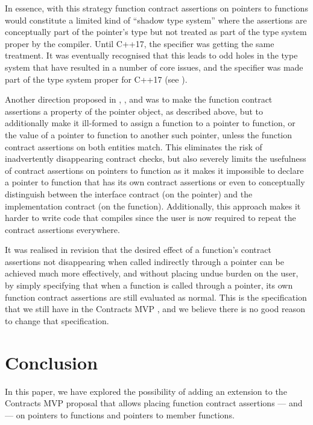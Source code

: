 In essence, with this strategy function contract assertions on pointers to functions would constitute a limited kind of ``shadow type system'' where the assertions are conceptually part of the pointer's type but not treated as part of the type system proper by the compiler. Until C++17, the  specifier was getting the same treatment. It was eventually recognised that this leads to odd holes in the type system that have resulted in a number of core issues, and the  specifier was made part of the type system proper for C++17 (see \cite{P0012R1}).

Another direction proposed in \cite{N4415}, \cite{P0287R0}, and \cite{P0380R0} was to make the function contract assertions a property of the pointer object, as described above, but to additionally make it ill-formed to assign a function to a pointer to function, or the value of a pointer to function to another such pointer, unless the function contract assertions on both entities match. This eliminates the risk of inadvertently disappearing contract checks, but also severely limits the usefulness of contract assertions on pointers to function as it makes it impossible to declare a pointer to function that has its own contract assertions or even to conceptually distinguish between the interface contract (on the pointer) and the implementation contract (on the function). Additionally, this approach makes it harder to write code that compiles since the user is now required to repeat the contract assertions everywhere.

It was realised in revision \cite{P0380R1} that the desired effect of a function's contract assertions not disappearing when called indirectly through a pointer can be achieved much more effectively, and without placing undue burden on the user, by simply specifying that when a function is called through a pointer, its own function contract assertions are still evaluated as normal. This is the specification that we still have in the Contracts MVP \cite{P2900R7}, and we believe there is no good reason to change that specification.

\section{Conclusion}

In this paper, we have explored the possibility of adding an extension to the Contracts MVP proposal \cite{P2900R7} that allows placing function contract assertions ---  and  --- on pointers to functions and pointers to member functions.

